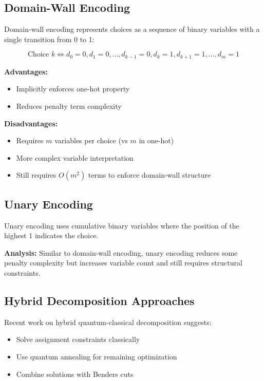 \documentclass[11pt,a4paper]{article}
\begin{document}
\subsection{Domain-Wall Encoding}

Domain-wall encoding \cite{kikuchi2025performance} represents choices as a sequence of binary variables with a single transition from 0 to 1:

\begin{equation}
\text{Choice } k \iff d_0 = 0, d_1 = 0, \ldots, d_{k-1} = 0, d_k = 1, d_{k+1} = 1, \ldots, d_{m} = 1
\end{equation}

\textbf{Advantages:}
\begin{itemize}
    \item Implicitly enforces one-hot property
    \item Reduces penalty term complexity
\end{itemize}

\textbf{Disadvantages:}
\begin{itemize}
    \item Requires $m$ variables per choice (vs $m$ in one-hot)
    \item More complex variable interpretation
    \item Still requires $O(m^2)$ terms to enforce domain-wall structure
\end{itemize}

\subsection{Unary Encoding}

Unary encoding uses cumulative binary variables where the position of the highest 1 indicates the choice.

\textbf{Analysis:} Similar to domain-wall encoding, unary encoding reduces some penalty complexity but increases variable count and still requires structural constraints.

\subsection{Hybrid Decomposition Approaches}

Recent work on hybrid quantum-classical decomposition \cite{joliot2025enhancing} suggests:
\begin{itemize}
    \item Solve assignment constraints classically
    \item Use quantum annealing for remaining optimization
    \item Combine solutions with Benders cuts
\end{itemize}
\end{document}
